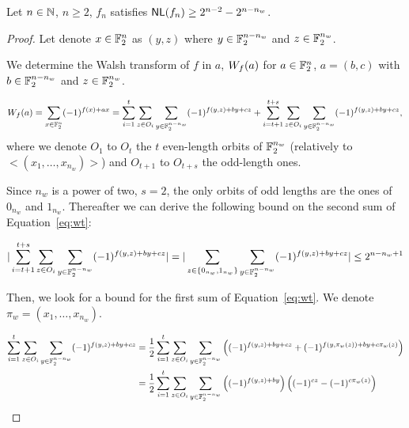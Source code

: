 \documentclass{llncs}
\begin{document}
\begin{proposition}
	
Let $n\in \mathbb{N}$, $n\ge 2$, $f_n$ satisfies $\mathsf{NL}(f_n)\ge 2^{n-2} - 2^{n-n_w}$.	
	
	
	
	
\end{proposition}
\begin{proof}
	Let denote $x\in \mathbb{F}_2^n$ as $(y,z)$ where $y\in \mathbb{F}_2^{n-n_w}$ and $z \in \mathbb{F}_2^{n_w}$.

We determine the Walsh transform of $f$ in $a$, $W_{f}(a)$ for $a\in \mathbb{F}_2^n$, $a=(b,c)$ with $b\in  \mathbb{F}_2^{n-n_w}$ and $z \in \mathbb{F}_2^{n_w}$.

\begin{equation}\label{eq:wt}
W_{f}(a)=\sum_{x\in \mathbb{F}_2^n} (-1)^{f(x)+a x}\\
=\sum_{i=1}^{t} \sum_{z\in O_i} \sum_{y\in \mathbb{F}_2^{n-n_w}}(-1)^{f(y,z)+by+cz} + \sum_{i=t+1}^{t+s} \sum_{z\in O_i} \sum_{y\in \mathbb{F}_2^{n-n_w}}(-1)^{f(y,z)+by+cz},\\
\end{equation}	
where we denote $O_1$ to $O_t$ the $t$ even-length orbits of $\mathbb{F}_2^{n_w}$ (relatively to $<(x_{1},\ldots,x_{n_w})>$) and $O_{t+1}$ to $O_{t+s}$ the odd-length ones.  
	
Since $n_w$ is a power of two, $s=2$, the only orbits of odd lengths are the ones of $0_{n_w}$ and  $1_{n_w}$. Thereafter we can derive the following bound on the second sum of Equation~\ref{eq:wt}:

\[|\sum_{i=t+1}^{t+s} \sum_{z\in O_i} \sum_{y\in \mathbb{F}_2^{n-n_w}}(-1)^{f(y,z)+by+cz}|= |\sum_{z\in \{0_{n_w},1_{n_w}\}} \sum_{y\in \mathbb{F}_2^{n-n_w}}(-1)^{f(y,z)+by+cz}|\le 2^{n-n_w+1}
\]

Then, we look for a bound for the first sum of Equation~\ref{eq:wt}. We denote $\pi_w=(x_{1},\ldots,x_{n_w})$.

\begin{align*}
\sum_{i=1}^{t} \sum_{z\in O_i} \sum_{y\in \mathbb{F}_2^{n-n_w}}(-1)^{f(y,z)+by+cz}&= \frac{1}{2}\sum_{i=1}^{t} \sum_{z\in O_i} \sum_{y\in \mathbb{F}_2^{n-n_w}} \left((-1)^{f(y,z)+by+cz} + (-1)^{f(y,\pi_w(z))+by+c\pi_w(z)} \right)\\
&=\frac{1}{2}\sum_{i=1}^{t} \sum_{z\in O_i} \sum_{y\in \mathbb{F}_2^{n-n_w}} \left((-1)^{f(y,z)+by}  \right)\left( (-1)^{cz}-(-1)^{c \pi_w(z)}   \right)
\end{align*}


\end{proof}
\end{document}
